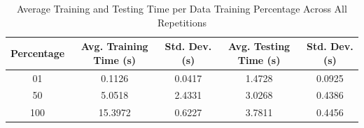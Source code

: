 \begin{table}[h]
\centering
\caption{Average Training and Testing Time per Data Training Percentage Across All Repetitions}
\begin{tabular}{c|cc|cc}
\toprule
Percentage & Avg. Training Time (s) & Std. Dev. (s) & Avg. Testing Time (s) & Std. Dev. (s) \\
\midrule
01 & 0.1126 & 0.0417 & 1.4728 & 0.0925 \\
50 & 5.0518 & 2.4331 & 3.0268 & 0.4386 \\
100 & 15.3972 & 0.6227 & 3.7811 & 0.4456 \\
\bottomrule
\end{tabular}
\end{table}
